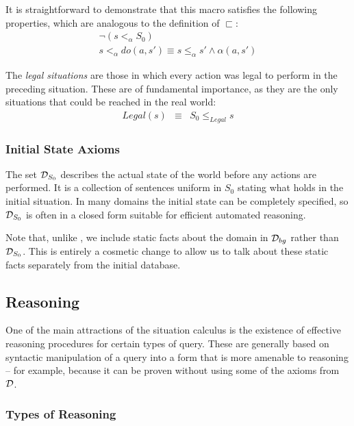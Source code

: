 It is straightforward to demonstrate that this macro satisfies the
following properties, which are analogous to the definition of $\sqsubset$:\begin{gather*}
\neg\left(s<_{\alpha}S_{0}\right)\\
s<_{\alpha}do(a,s')\equiv s\leq_{\alpha}s'\wedge\alpha(a,s')\end{gather*}


The \emph{legal situations} are those in which every action was legal
to perform in the preceding situation. These are of fundamental importance,
as they are the only situations that could be reached in the real
world:\begin{eqnarray*}
Legal(s) & \equiv & S_{0}\leq_{Legal}s\end{eqnarray*}



\subsubsection{Initial State Axioms}

The set $\mathcal{D}_{S_{0}}$ describes the actual state of the world before
any actions are performed. It is a collection of sentences uniform
in $S_{0}$ stating what holds in the initial situation. In many domains
the initial state can be completely specified, so $\mathcal{D}_{S_{0}}$ is
often in a closed form suitable for efficient automated reasoning.

Note that, unlike \citep{levesque98sc_foundations,pirri99contributions_sitcalc,reiter01kia},
we include static facts about the domain in $\mathcal{D}_{bg}$ rather than
$\mathcal{D}_{S_{0}}$. This is entirely a cosmetic change to allow us to
talk about these static facts separately from the initial database.


\subsection{Reasoning}

One of the main attractions of the situation calculus is the existence
of effective reasoning procedures for certain types of query. These
are generally based on syntactic manipulation of a query into a form
that is more amenable to reasoning -- for example, because it can
be proven without using some of the axioms from $\mathcal{D}$.


\subsubsection{Types of Reasoning}

